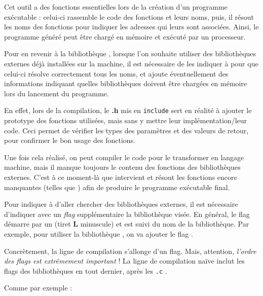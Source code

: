 \documentclass[11pt,a4paper]{article}
\begin{document}
\medskip

Cet outil  a des fonctions essentielles lors de la création d'un programme exécutable : celui-ci rassemble le code des fonctions et leurs noms, puis, il résout les noms des fonctions pour indiquer les adresses qui leurs sont associées.
Ainsi, le programme généré peut être chargé en mémoire et exécuté par un processeur.

\bigskip

Pour en revenir à la bibliothèque , lorsque l'on souhaite utiliser des bibliothèques externes déjà installées sur la machine, il est nécessaire de les indiquer à  pour que celui-ci résolve correctement tous les noms, et ajoute éventuellement des informations indiquant quelles bibliothèques doivent être chargées en mémoire lors du lancement du programme.

\medskip

En effet, lors de la compilation, le \textbf{.h} mis en \texttt{include} sert en réalité à ajouter le prototype des fonctions utilisées, mais sans y mettre leur implémentation/leur code.
Ceci permet de vérifier les types des paramètres et des valeurs de retour, pour confirmer le bon usage des fonctions.

Une fois cela réalisé, on peut compiler le code pour le transformer en langage machine, mais il manque toujours le contenu des fonctions des bibliothèques externes.
C'est à ce moment-là que  intervient et résout les fonctions encore manquantes (telles que ) afin de produire le programme exécutable final.

\bigskip

Pour indiquer à  d'aller chercher des bibliothèques externes, il est nécessaire d'indiquer avec un \textit{flag} supplémentaire la bibliothèque visée.
En général, le flag démarre par un  (tiret \textbf{L} minuscule) et est suivi du nom de la bibliothèque.
Par exemple, pour utiliser la bibliothèque , on va ajouter le flag  .

\medskip

Concrètement, la ligne de compilation s'allonge d'un flag.
Mais, attention, \textit{l'ordre des flags est extrêmement important} !
La ligne de compilation naïve inclut les flags des bibliothèques en tout dernier, après les \texttt{.c} .

\medskip

Comme par exemple :

\medskip

\end{document}
